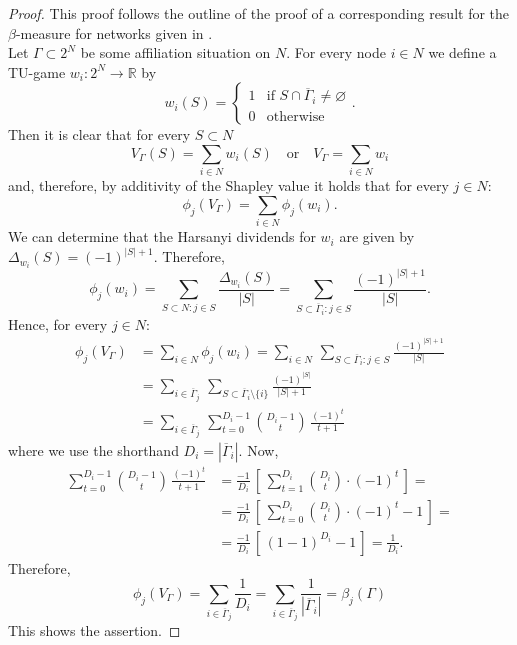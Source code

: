 \begin{proof}
This proof follows the outline of the proof of a corresponding result for the $\beta$-measure for networks given in \citet{Gilles2010}.
\\
Let $\Gamma \subset 2^N$ be some affiliation situation on $N$. For every node $i \in N$ we define a TU-game $w_i \colon 2^N \to \mathbb{R}$ by
\begin{equation}
w_i (S) = \left\{
\begin{array}{ll}
1 & \mbox{if } S \cap \overline{\Gamma}_i \neq \varnothing \\
0 & \mbox{otherwise}
\end{array} \right. .
\end{equation}
Then it is clear that for every $S \subset N$
\begin{equation}
V_{\Gamma} (S) = \sum_{i \in N} w_i (S) \quad \mbox{or} \quad V_{\Gamma} = \sum_{i \in N} w_i
\end{equation}
and, therefore, by additivity of the Shapley value it holds that for every $j \in N \colon$
\begin{equation}
\phi_j \left( V_{\Gamma} \right) = \sum_{i \in N} \phi_j \left( w_i \right) .
\end{equation}
We can determine that the Harsanyi dividends for $w_i$ are given by $\Delta_{w_i} (S) = (-1)^{|S|+1}$. Therefore,
\begin{equation}
\phi_j (w_i) = \sum_{S \subset N \colon j \in S} \frac{\Delta_{w_i} (S)}{|S|} = \sum_{S \subset \overline{\Gamma}_i \colon j \in S} \frac{(-1)^{|S|+1}}{|S|} .
\end{equation}
Hence, for every $j \in N \colon$
\begin{align*}
\phi_j \left( V_{\Gamma} \right) & = \sum_{i \in N} \phi_j (w_i) = \sum_{i \in N} \, \sum_{S \subset \overline{\Gamma}_i \colon j \in S} \frac{(-1)^{|S|+1}}{|S|} \\[1ex]
& = \sum_{i \in \overline{\Gamma}_j} \, \sum_{S \subset \overline{\Gamma}_i \setminus \{ i \} } \frac{(-1)^{|S|}}{|S|+1} \\[1ex]
& = \sum_{i \in \overline{\Gamma}_j} \, \sum^{D_i-1}_{t=0} \binom{D_i-1}{t} \, \frac{(-1)^t}{t+1}
\end{align*}
where we use the shorthand $D_i = \left| \overline{\Gamma}_i \right|$. Now,
\begin{align*}
\sum^{D_i-1}_{t=0} \binom{D_i-1}{t} \, \frac{(-1)^t}{t+1} & = \frac{-1}{D_i} \, \left[ \, \sum^{D_i}_{t=1} \binom{D_i}{t} \cdot (-1)^t \, \right] = \\[1ex]
& = \frac{-1}{D_i} \, \left[ \, \sum^{D_i}_{t=0} \binom{D_i}{t} \cdot (-1)^t -1 \, \right] = \\[1ex]
& = \frac{-1}{D_i} \, \left[ \, (1-1)^{D_i} -1 \, \right] = \frac{1}{D_i} .
\end{align*}
Therefore,
\[
\phi_j \left( V_{\Gamma} \right) = \sum_{i \in \overline{\Gamma}_j} \frac{1}{D_i} = \sum_{i \in \overline{\Gamma}_j} \frac{1}{\left| \overline{\Gamma}_i \right|} = \beta_j (\Gamma )
\]
This shows the assertion.
\end{proof}

